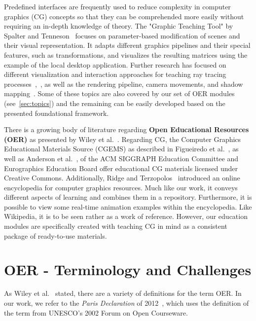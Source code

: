 Predefined interfaces are frequently used to reduce complexity in computer graphics (CG) concepts so that they can be comprehended more easily without requiring an in-depth knowledge of theory. The "Graphic Teaching Tool" by Spalter and Tenneson~\cite{Spalter:2006:cg-tool} focuses on parameter-based modification of scenes and their visual representation. It adapts different graphics pipelines and their special features, such as transformations, and visualizes the resulting matrices using the example of the local desktop application. Further research has focused on different visualization and interaction approaches for teaching ray tracing processes~\cite{Suselo:2018:cg-tool},~\cite{ Verschoore-de-la-Houssaije:2022:cg-tool}, as well as the rendering pipeline, camera movements, and shadow mapping~\cite{Eisemann:2023:cg-tool}. Some of these topics are also covered by our set of OER modules (see~\autoref{sec:topics}) and the remaining can be easily developed based on the presented foundational framework.

There is a growing body of literature regarding \textbf{Open Educational Resources (OER)} as presented by Wiley et al.~\cite{wiley:2014:oer}. Regarding CG, the Computer Graphics Educational Materials Source (CGEMS) as described in Figueiredo et al.~\cite{figueiredo:2003:cgems}, \cite{figueiredo:2004:cgems2} as well as Anderson et al.~\cite{anderson:2017:NewCGEMS}, of the ACM SIGGRAPH Education Committee and Eurographics Education Board offer educational CG materials licensed under Creative Commons. Additionally, Ridge and Terzopolos~\cite{ridge:2019:ecosystem} introduced an online encyclopedia for computer graphics resources. Much like our work, it conveys different aspects of learning and combines them in a repository. Furthermore, it is possible to view some real-time animation examples within the encyclopedia. Like Wikipedia, it is to be seen rather as a work of reference. However, our education modules are specifically created with teaching CG in mind as a consistent package of ready-to-use materials. %


\section{OER - Terminology and Challenges \label{sec:challenges}} %
As Wiley et al.~\cite{wiley:2014:oer} stated, there are a variety of definitions for the term OER. In our work, we refer to the \emph{Paris Declaration} of 2012~\cite{declaration:2012:paris}, which uses the definition of the term from UNESCO’s 2002 Forum on Open Courseware.

